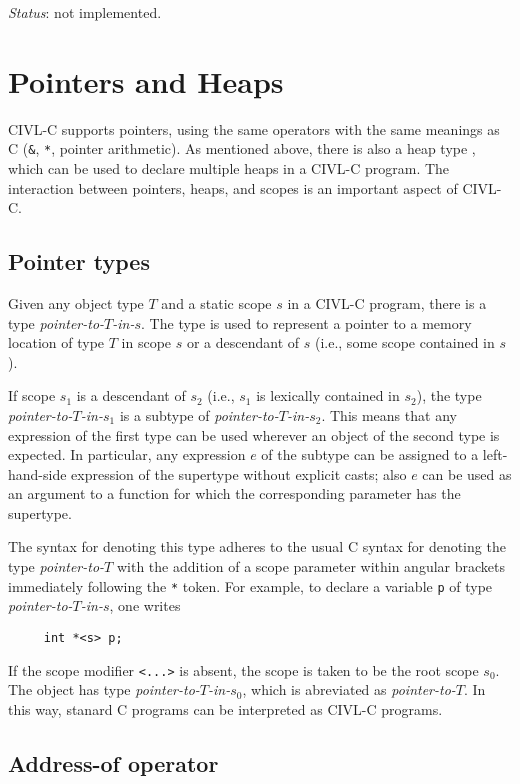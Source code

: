 \emph{Status}: not implemented.

\chapter{Pointers and Heaps}


CIVL-C supports pointers, using the same operators with the same
meanings as C (\texttt{\&}, \texttt{*}, pointer arithmetic).
As mentioned above, there is also a heap type \cheap{}, which can
be used to declare multiple heaps in a CIVL-C program.  The
interaction between pointers, heaps, and scopes is an important
aspect of CIVL-C.

\section{Pointer types}

Given any object type $T$ and a static scope $s$ in a CIVL-C program,
there is a type \emph{pointer-to-$T$-in-$s$}.  The type is used to
represent a pointer to a memory location of type $T$ in scope $s$ or a
descendant of $s$ (i.e., some scope contained in $s$).

If scope $s_1$ is a descendant of $s_2$ (i.e., $s_1$ is lexically
contained in $s_2$), the type \emph{pointer-to-$T$-in-$s_1$} is a
subtype of \emph{pointer-to-$T$-in-$s_2$}.  This means that any
expression of the first type can be used wherever an object of the
second type is expected.  In particular, any expression $e$ of the
subtype can be assigned to a left-hand-side expression of the
supertype without explicit casts; also $e$ can be used as an argument
to a function for which the corresponding parameter has the supertype.

The syntax for denoting this type adheres to the usual C syntax for
denoting the type \emph{pointer-to-$T$} with the addition of a scope
parameter within angular brackets immediately following the \texttt{*}
token.  For example, to declare a variable \texttt{p} of type
\emph{pointer-to-$T$-in-$s$}, one writes
\begin{verbatim}
     int *<s> p;
\end{verbatim}
If the scope modifier \texttt{<...>} is absent, the scope is taken to
be the root scope $s_0$.  The object has type
\emph{pointer-to-$T$-in-$s_0$}, which is abreviated as
\emph{pointer-to-$T$}.  In this way, stanard C programs can be
interpreted as CIVL-C programs.

\section{Address-of operator}

